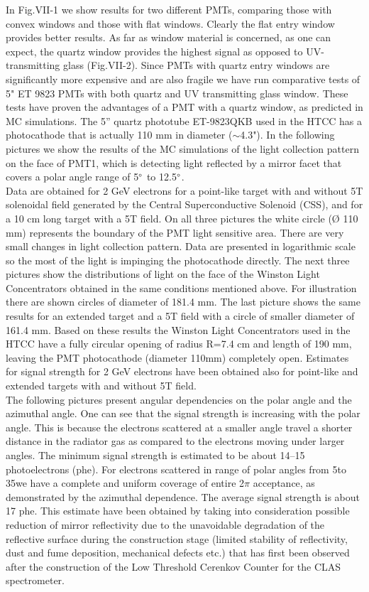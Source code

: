 In Fig.VII-1 we show results for two different PMTs, comparing those with convex windows and those with flat windows. Clearly the flat entry window provides better results. As far as window material is concerned, as one can expect, the quartz window provides the highest signal as opposed to UV-transmitting glass (Fig.VII-2). Since PMTs with quartz entry windows are significantly more expensive and are also fragile we have run comparative tests of 5" ET 9823 PMTs with both quartz and UV transmitting glass window. These tests have proven the advantages of a PMT with a quartz window, as predicted in MC simulations. The 5” quartz phototube ET-9823QKB used in the HTCC has a photocathode that is actually 110 mm in diameter ($\sim$4.3"). In the following pictures we show the results of the MC simulations of the light collection pattern on the face of PMT1, which is detecting light reflected by a mirror facet that covers a polar angle range of 5$\degree$ to 12.5$\degree$. \\
\indent Data are obtained for 2 GeV electrons for a point-like target with and without 5T solenoidal field generated by the Central Superconductive Solenoid (CSS), and for a 10 cm long target with a 5T field. On all three pictures the white circle (Ø 110 mm) represents the boundary of the PMT light sensitive area. There are very small changes in light collection pattern. Data are presented in logarithmic scale so the most of the light is impinging the photocathode directly. The next three pictures show the distributions of light on the face of the Winston Light Concentrators obtained in the same conditions mentioned above. For illustration there are shown circles of diameter of 181.4 mm. The last picture shows the same results for an extended target and a 5T field with a circle of smaller diameter of 161.4 mm. Based on these results the Winston Light Concentrators used in the HTCC have a fully circular opening of radius R=7.4 cm and length of 190 mm, leaving the PMT photocathode (diameter 110mm) completely open. Estimates for signal strength for 2 GeV electrons have been obtained also for point-like and extended targets with and without 5T field. \\
\indent The following pictures present angular dependencies on the polar angle and the azimuthal angle. One can see that the signal strength is increasing with the polar angle. This is because the electrons scattered at a smaller angle travel a shorter distance in the radiator gas as compared to the electrons moving under larger angles. The minimum signal strength is estimated to be about 14–15 photoelectrons (phe). For electrons scattered in range of polar angles from 5\degree to 35\degree we have a complete and uniform coverage of entire 2$\pi$ acceptance, as demonstrated by the azimuthal dependence. The average signal strength is about 17 phe. This estimate have been obtained by taking into consideration possible reduction of mirror reflectivity due to the unavoidable degradation of the reflective surface during the construction stage (limited stability of reflectivity, dust and fume deposition, mechanical defects etc.) that has first been observed after the construction of the Low Threshold Cerenkov Counter for the CLAS spectrometer. \\
